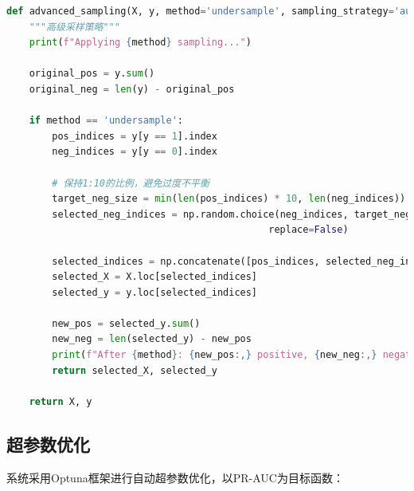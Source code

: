 \documentclass[12pt,a4paper]{article}
\begin{document}
\begin{lstlisting}[language=Python, caption=智能采样实现]
def advanced_sampling(X, y, method='undersample', sampling_strategy='auto'):
    """高级采样策略"""
    print(f"Applying {method} sampling...")
    
    original_pos = y.sum()
    original_neg = len(y) - original_pos
    
    if method == 'undersample':
        pos_indices = y[y == 1].index
        neg_indices = y[y == 0].index
        
        # 保持1:10的比例，避免过度不平衡
        target_neg_size = min(len(pos_indices) * 10, len(neg_indices))
        selected_neg_indices = np.random.choice(neg_indices, target_neg_size, 
                                              replace=False)
        
        selected_indices = np.concatenate([pos_indices, selected_neg_indices])
        selected_X = X.loc[selected_indices]
        selected_y = y.loc[selected_indices]
        
        new_pos = selected_y.sum()
        new_neg = len(selected_y) - new_pos
        print(f"After {method}: {new_pos:,} positive, {new_neg:,} negative")
        return selected_X, selected_y
    
    return X, y
\end{lstlisting}

\subsection{超参数优化}

系统采用Optuna框架进行自动超参数优化，以PR-AUC为目标函数：
\end{document}

